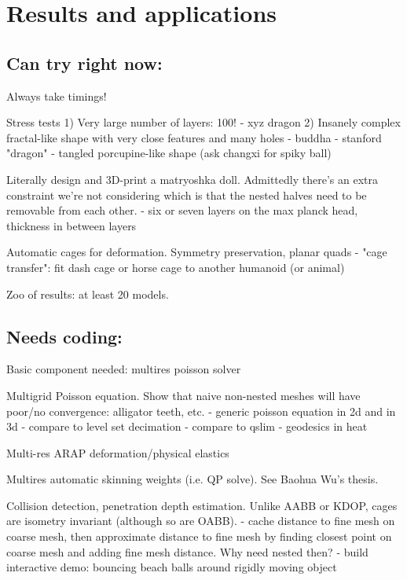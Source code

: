 
\section{Results and applications}
\label{sec:results}

\subsection{Can try right now:}

Always take timings!

Stress tests
  1) Very large number of layers: 100!
    - xyz dragon
  2) Insanely complex fractal-like shape with very close features and many holes
    - buddha
    - stanford "dragon"
    - tangled porcupine-like shape (ask changxi for spiky ball)

Literally design and 3D-print a matryoshka doll. Admittedly there's an extra
constraint we're not considering which is that the nested halves need to be
removable from each other.
  - six or seven layers on the max planck head, thickness in between layers

Automatic cages for deformation. Symmetry preservation, planar quads
  - "cage transfer": fit dash cage or horse cage to another humanoid (or
    animal)

Zoo of results: at least 20 models.

\subsection{Needs coding:}

Basic component needed: multires poisson solver

Multigrid Poisson equation. Show that naive non-nested meshes will have
poor/no convergence: alligator teeth, etc.
  - generic poisson equation in 2d and in 3d
    - compare to level set decimation
    - compare to qslim
  - geodesics in heat 

Multi-res ARAP deformation/physical elastics

Multires automatic skinning weights (i.e. QP solve). See Baohua Wu's thesis.

Collision detection, penetration depth estimation. Unlike AABB or KDOP, cages
are isometry invariant (although so are OABB).
  - cache distance to fine mesh on coarse mesh, then approximate distance to
    fine mesh by finding closest point on coarse mesh and adding fine mesh
    distance. Why need nested then?
  - build interactive demo: bouncing beach balls around rigidly moving object

